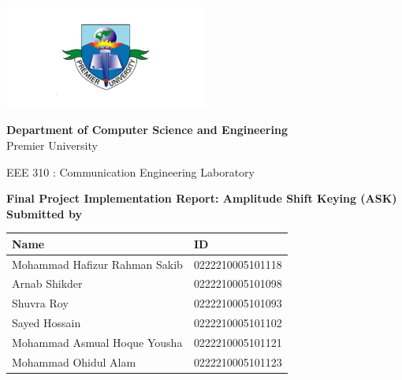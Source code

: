\documentclass[12pt,a4paper]{article}
\begin{document}
\begin{titlepage}
    \centering
    \begin{center}
        \includegraphics[width=0.5\textwidth]{./logo.png}
    \end{center}
\begin{center}
    \textbf{Department of Computer Science and Engineering}\\
    Premier University
\end{center}
\begin{center}
    \textnormal{EEE 310 : Communication Engineering Laboratory}
\end{center}
    \vspace{0.5in}
    \LARGE
    \textbf{Final Project Implementation Report: Amplitude Shift Keying (ASK)}\\
    \vspace{1in}
    \large
    \textbf {Submitted by}\\
    \begin{center}
        \renewcommand{\arraystretch}{1.5} %
        \begin{tabular}{|>{\raggedright\arraybackslash}p{}|p{}|} %
        \hline
        \textbf{Name} & \textbf{ID} \\
        \hline
        Mohammad Hafizur Rahman Sakib & 0222210005101118 \\
        \hline
        Arnab Shikder & 0222210005101098 \\
        \hline
        Shuvra Roy & 0222210005101093 \\
        \hline
        Sayed Hossain & 0222210005101102 \\
        \hline
        Mohammad Asmual Hoque Yousha & 0222210005101121 \\
        \hline
        Mohammad Ohidul Alam & 0222210005101123 \\
        \hline
        \end{tabular}
        \end{center}
    \vspace{0.5in}
 

\end{titlepage}
\end{document}
